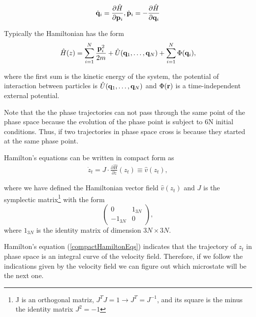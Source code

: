 \documentclass[a4paper,openright,12pt]{book}
\begin{document}
\begin{equation}
    \dot{{\bf q}}_i = \frac{\partial \hat{H}}{\partial {\bf p}_i}, \dot{{\bf p}}_i = -\frac{\partial \hat{H}}{\partial {\bf q}_i}
  \label{HamiltonEqs}
\end{equation}

Typically the Hamiltonian has the form
\begin{align}
    \hat{H}(z) = \sum_{i=1}^{N}\frac{{\bf p}_i^2}{2m}+\hat{U}({\bf q}_1,\dots,{\bf q}_N)+\sum_{i=1}^{N}\Phi({\bf q}_i),
\end{align}

where the first sum is the kinetic energy of the system, the potential of interaction
between particles is $\hat{U}({\bf q}_1,\dots,{\bf q}_N)$ and $\Phi({\bf r})$ is a time-independent external potential. 


Note that the the phase trajectories can not pass through the same point of the phase space because the evolution of the phase point is subject to 6N initial conditions. 
Thus, if two trajectories in phase space cross is because they started at the same phase point.  


Hamilton's equations can be written in compact form as
\begin{align}
  \dot{z}_t = J\cdot\frac{\partial\hat{H}}{\partial{z}}(z_t)\equiv \hat{v}(z_t),
  \label{compactHamiltonEqs}
\end{align}

where we have defined the Hamiltonian vector field $\hat{v}(z_t)$ and $J$ is the symplectic matrix\footnote{J is an orthogonal matriz, $J^TJ=1\to J^T = J^{-1}$, and its square is the minus the identity matrix $J^2=-1$} with the form
$$
\begin{pmatrix} 
  0 & 1_{3N} \\
  -1_{3N} & 0 
\end{pmatrix},
$$
where $1_{3N}$ is the identity matrix of dimension $3N \times 3N$.

Hamilton's equation (\ref{compactHamiltonEqs}) indicates that the trajectory of $z_t$ in phase space is an integral curve of the velocity field. Therefore, if we follow the indications given by the velocity field we can figure out which microstate will be the next one. 
\end{document}

